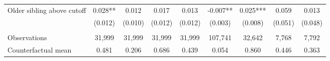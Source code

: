 {{\begin{tabular}{lcccccccc}
Older sibling above cutoff&       0.028** &       0.012   &       0.017   &       0.013   &      -0.007** &       0.025***&       0.059   &       0.013   \\
                    &     (0.012)   &     (0.010)   &     (0.012)   &     (0.012)   &     (0.003)   &     (0.008)   &     (0.051)   &     (0.048)   \\
                    &               &               &               &               &               &               &               &               \\
Observations        &      31,999   &      31,999   &      31,999   &      31,999   &     107,741   &      32,642   &       7,768   &       7,792   \\
Counterfactual mean &       0.481   &       0.206   &       0.686   &       0.439   &       0.054   &       0.860   &       0.446   &       0.363   \\
 

\bottomrule
\end{tabular}
}
}

